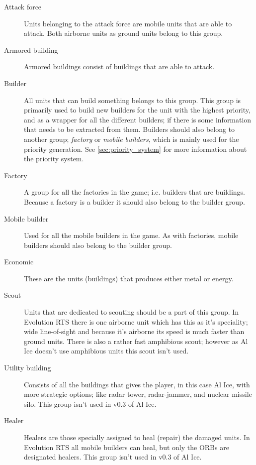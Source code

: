 \begin{description}
\item[Attack force] Units belonging to the attack force are mobile units that
are able to attack. Both airborne units as ground units belong to this group.
\item[Armored building] Armored buildings consist of buildings that are
able to attack.
\item[Builder] All units that can build something belongs to this group. This
group is primarily used to build new builders for the unit with the highest priority, and as a
wrapper for all the different builders; if there is some information that needs to be extracted from
them. Builders should also belong to another group; \emph{factory} or \emph{mobile builders}, which is
mainly used for the priority generation. See \ref{sec:priority_system} for more information
about the priority system.
\item[Factory] A group for
all the factories in the game; i.e. builders that are buildings. Because a factory is a builder it should also belong to the builder group.
\item[Mobile builder] Used for all the mobile builders in the game. As with
factories, mobile builders should also belong to the builder group.
\item[Economic] These are the units (buildings) that produces either metal
or energy.
\item[Scout] Units that are dedicated to scouting should be a part of this group. In
Evolution RTS there is one airborne unit which has this as it's speciality; wide line-of-sight and
because it's airborne its speed is much faster than ground units. There is also a rather fast
amphibious scout; however as Al Ice doesn't use amphibious units this scout isn't used.
\item[Utility building] Consists of all the buildings that gives the player,
in this case Al Ice, with more strategic options; like radar tower, radar-jammer, and nuclear missile silo.
This group isn't used in v0.3 of Al Ice.
\item[Healer] Healers are those specially assigned to heal (repair) the damaged units.
In Evolution RTS all mobile builders can heal, but only the ORBs are designated healers. This group
isn't used in v0.3 of Al Ice.
\end{description}



